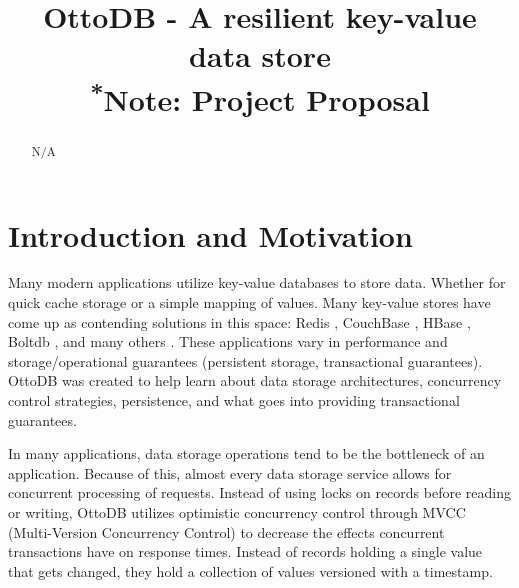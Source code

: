 \documentclass[conference]{IEEEtran}
\begin{document}
    
    \title{OttoDB - A resilient key-value data store\\
    {\footnotesize \textsuperscript{*}Note: Project Proposal}
    }
    
    \author{
    }
    
    \maketitle
    

    \begin{abstract}
    N/A
    \end{abstract}
    
    

    \section{Introduction and Motivation}
    Many modern applications utilize key-value databases to store data. Whether for quick cache storage or a simple mapping of values. Many key-value stores have come up as contending solutions in this space: Redis \cite{b1}, CouchBase \cite{b3}, HBase \cite{b4}, Boltdb \cite{b5}, and many others \cite{b6, b7, b8}. These applications vary in performance and storage/operational guarantees (persistent storage, transactional guarantees). OttoDB was created to help learn about data storage architectures, concurrency control strategies, persistence, and what goes into providing transactional guarantees. 

    In many applications, data storage operations tend to be the bottleneck of an application. Because of this, almost every data storage service allows for concurrent processing of requests. Instead of using locks on records before reading or writing, OttoDB utilizes optimistic concurrency control through MVCC (Multi-Version Concurrency Control) to decrease the effects concurrent transactions have on response times. Instead of records holding a single value that gets changed, they hold a collection of values versioned with a timestamp.
\end{document}
